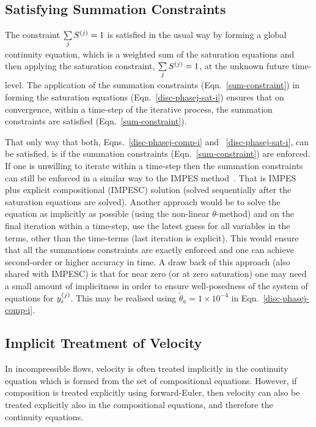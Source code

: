 \subsection{Satisfying Summation Constraints} \label{Chapter:CompositionalModel:Section:SatisfyingConstraints}
The constraint $\summation_{j}\mfr[S]{}{j}=1$ is satisfied in the usual way by forming a global continuity equation, which is a weighted sum of the saturation equations and then applying the saturation constraint, $\summation_{j}\mfr[S]{}{j}=1$, at the unknown future time-level. The application of the summation constraints (Eqn.~\ref{sum-constraint}) in forming the saturation equations (Eqn.~\ref{disc-phasej-sat-i}) ensures that on convergence, within a time-step of the iterative process, the summation constraints are satisfied (\ie Eqn.~\ref{sum-constraint}). 


That only way that both, Eqns.~\ref{disc-phasej-comp-i} and ~\ref{disc-phasej-sat-i}, can be satisfied, is if the summation constraints (Eqn.~\ref{sum-constraint}) are enforced. If one is unwilling to iterate within a time-step then the summation constraints can still be enforced in a similar way to the IMPES method~\citep[\ie implicit pressure explicit saturation method, see][for further details]{chen_2006,coats_2000,Haukas_2006}. That is IMPES plus explicit compositional (IMPESC) solution (solved sequentially after the saturation equations are solved). Another approach would be to solve the equation as implicitly as possible (\eg using the non-linear $\theta$-method) and on the final iteration within a time-step, use the latest guess for all variables in the terms, other than the time-terms (last iteration is explicit). This would ensure that all the summations constraints are exactly enforced and one can achieve second-order or higher accuracy in time. A draw back of this approach (also shared with IMPESC) is that for near zero (or at zero saturation) one may need a small amount of implicitness in order to ensure well-posedness of the system of equations for $\mfr[y]{i}{j}$. This may be realised using $\tilde\theta_a=1\times 10^{-4}$ in Eqn.~\ref{disc-phasej-comp-i}. 



\subsection{Implicit Treatment of Velocity}\label{Chapter:CompositionalModel:Section:ImpVelocity}
In incompressible flows, velocity is often treated implicitly in the continuity equation which is formed from the set of compositional equations. However, if composition is treated explicitly using forward-Euler, then velocity can also be treated explicitly also in the compositional equations, and therefore the continuity equations. 

